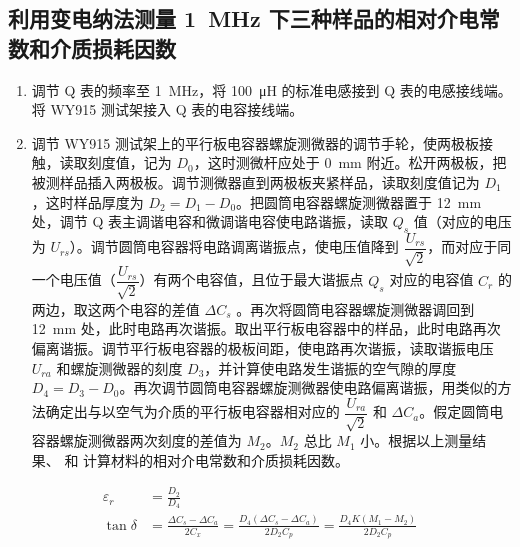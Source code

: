 \documentclass[a4paper,utf8]{article}
\begin{document}
    \subsection{利用变电纳法测量 \SI{1}{\mega\hertz} 下三种样品的相对介电常数和介质损耗因数}
        \begin{enumerate}
            \item 调节 Q 表的频率至 \SI{1}{\mega\hertz}，将 \SI{100}{\micro\henry} 的标准电感接到 Q 表的电感接线端。将 WY915 测试架接入 Q 表的电容接线端。
            \item 调节 WY915 测试架上的平行板电容器螺旋测微器的调节手轮，使两极板接触，读取刻度值，记为 $D_0$，这时测微杆应处于 \SI{0}{\milli\metre} 附近。松开两极板，把被测样品插入两极板。调节测微器直到两极板夹紧样品，读取刻度值记为 $D_1$，这时样品厚度为 $D_2 = D_1 - D_0$。把圆筒电容器螺旋测微器置于 \SI{12}{\milli\metre} 处，调节 Q 表主调谐电容和微调谐电容使电路谐振，读取 $Q_s$ 值（对应的电压为 $U_{rs}$）。调节圆筒电容器将电路调离谐振点，使电压值降到 $\dfrac{U_{rs}}{\sqrt{2}}$，而对应于同一个电压值（$\dfrac{U_{rs}}{\sqrt{2}}$）有两个电容值，且位于最大谐振点 $Q_s$ 对应的电容值 $C_r$ 的两边，取这两个电容的差值 $\varDelta C_s$ 。再次将圆筒电容器螺旋测微器调回到 \SI{12}{\milli\metre} 处，此时电路再次谐振。取出平行板电容器中的样品，此时电路再次偏离谐振。调节平行板电容器的极板间距，使电路再次谐振，读取谐振电压 $U_{ra}$ 和螺旋测微器的刻度 $D_3$，并计算使电路发生谐振的空气隙的厚度 $D_4=D_3-D_0$。再次调节圆筒电容器螺旋测微器使电路偏离谐振，用类似的方法确定出与以空气为介质的平行板电容器相对应的 $\dfrac{U_{ra}}{\sqrt{2}}$ 和 $\varDelta C_a$。假定圆筒电容器螺旋测微器两次刻度的差值为 $M_2$。$M_2$ 总比 $M_1$ 小。根据以上测量结果、 和 计算材料的相对介电常数和介质损耗因数。
        \end{enumerate}
        \begin{align}
            \varepsilon_r&=\frac{D_2}{D_4}\label{eq23}\\
            \tan\delta&=\frac{\Delta C_{s}-\Delta C_{a}}{2C_{x}}=\frac{D_{4}(\Delta C_{s}-\Delta C_{a})}{2D_{2}C_{p}}=\frac{D_{4}K(M_{1}-M_{2})}{2D_{2}C_{p}}\label{eq24}
        \end{align}
\end{document}
